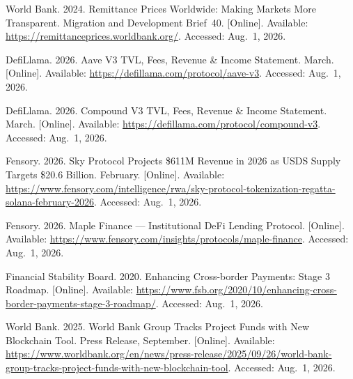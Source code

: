 \documentclass[12pt,a4paper]{report}
\begin{document}
{\begin{enumerate}[label={[\arabic*]}]
\item World Bank. 2024. Remittance Prices Worldwide: Making Markets More Transparent. Migration and Development Brief~40. [Online]. Available: \url{https://remittanceprices.worldbank.org/}. Accessed: Aug.~1, 2026.

\item DefiLlama. 2026. Aave V3 TVL, Fees, Revenue \& Income Statement. March. [Online]. Available: \url{https://defillama.com/protocol/aave-v3}. Accessed: Aug.~1, 2026.

\item DefiLlama. 2026. Compound V3 TVL, Fees, Revenue \& Income Statement. March. [Online]. Available: \url{https://defillama.com/protocol/compound-v3}. Accessed: Aug.~1, 2026.

\item Fensory. 2026. Sky Protocol Projects \$611M Revenue in 2026 as USDS Supply Targets \$20.6 Billion. February. [Online]. Available: \url{https://www.fensory.com/intelligence/rwa/sky-protocol-tokenization-regatta-solana-february-2026}. Accessed: Aug.~1, 2026.

\item Fensory. 2026. Maple Finance --- Institutional DeFi Lending Protocol. [Online]. Available: \url{https://www.fensory.com/insights/protocols/maple-finance}. Accessed: Aug.~1, 2026.


\item Financial Stability Board. 2020. Enhancing Cross-border Payments: Stage 3 Roadmap. [Online]. Available: \url{https://www.fsb.org/2020/10/enhancing-cross-border-payments-stage-3-roadmap/}. Accessed: Aug.~1, 2026.


\item World Bank. 2025. World Bank Group Tracks Project Funds with New Blockchain Tool. Press Release, September. [Online]. Available: \url{https://www.worldbank.org/en/news/press-release/2025/09/26/world-bank-group-tracks-project-funds-with-new-blockchain-tool}. Accessed: Aug.~1, 2026.


\end{enumerate}}
\end{document}
